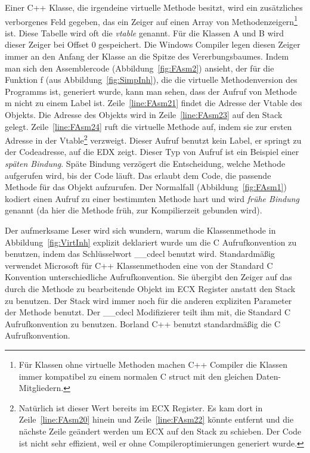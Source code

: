  Einer C++ Klasse, die irgendeine virtuelle
Methode besitzt, wird ein zus\"{a}tzliches verborgenes Feld gegeben, das
ein Zeiger auf einen Array von Methodenzeigern\footnote{F\"{u}r Klassen
ohne virtuelle Methoden machen C++ Compiler die Klassen immer
kompatibel zu einem normalen C struct mit den gleichen
Daten-Mitgliedern.} ist. Diese Tabelle wird oft die \emph{vtable}
genannt. F\"{u}r die Klassen {\code A} und {\code B} wird dieser Zeiger
bei Offset 0 gespeichert. Die Windows Compiler legen diesen Zeiger
immer an den Anfang der Klasse an die Spitze des Vererbungsbaumes.
Indem man sich den Assemblercode (Abbildung~\ref{fig:FAsm2})
ansieht, der f\"{u}r die Funktion {\code f} (aus
Abbildung~\ref{fig:SimpInh}), die die virtuelle Methodenversion des
Programms ist, generiert wurde, kann man sehen, dass der Aufruf von
Methode {\code m} nicht zu einem Label ist. Zeile~\ref{line:FAsm21}
findet die Adresse der Vtable des Objekts. Die Adresse des Objekts
wird in Zeile~\ref{line:FAsm23} auf den Stack gelegt.
Zeile~\ref{line:FAsm24} ruft die virtuelle Methode auf, indem sie
zur ersten Adresse in der Vtable\footnote{Nat\"{u}rlich ist dieser Wert
bereits im {\code ECX} Register. Es kam dort in
Zeile~\ref{line:FAsm20} hinein und Zeile~\ref{line:FAsm22} k\"{o}nnte
entfernt und die n\"{a}chste Zeile ge\"{a}ndert werden um {\code ECX} auf
den Stack zu schieben. Der Code ist nicht sehr effizient, weil er
ohne Compileroptimierungen generiert wurde.} verzweigt. Dieser
Aufruf benutzt kein Label, er springt zu der Codeadresse, auf die
{\code EDX} zeigt. Dieser Typ von Aufruf ist ein Beispiel einer
\emph{sp\"{a}ten Bindung}.    Sp\"{a}te Bindung verz\"{o}gert die
Entscheidung, welche Methode aufgerufen wird, bis der Code l\"{a}uft.
Das erlaubt dem Code, die passende Methode f\"{u}r das Objekt
aufzurufen. Der Normalfall (Abbildung~\ref{fig:FAsm1}) kodiert einen
Aufruf zu einer bestimmten Methode hart und wird \emph{fr\"{u}he
Bindung}  
 genannt (da hier die Methode fr\"{u}h, zur
Kompilierzeit gebunden wird).

Der aufmerksame Leser wird sich wundern, warum die Klassenmethode in
Abbildung~\ref{fig:VirtInh} explizit deklariert wurde um die C
Aufrufkonvention zu benutzen, indem das Schl\"{u}sselwort {\code
\_\_cdecl} benutzt wird. Standardm\"{a}{\ss}ig verwendet Microsoft
 f\"{u}r C++ Klassenmethoden eine von der
Standard C Konvention unterschiedliche Aufrufkonvention. Sie
\"{u}bergibt den Zeiger auf das durch die Methode zu bearbeitende Objekt
im {\code ECX} Register anstatt den Stack zu benutzen. Der Stack
wird immer noch f\"{u}r die anderen expliziten Parameter der Methode
benutzt. Der {\code \_\_cdecl} Modifizierer teilt ihm mit, die
Standard C Aufrufkonvention zu benutzen. Borland C++
 benutzt standardm\"{a}{\ss}ig die C
Aufrufkonvention.

